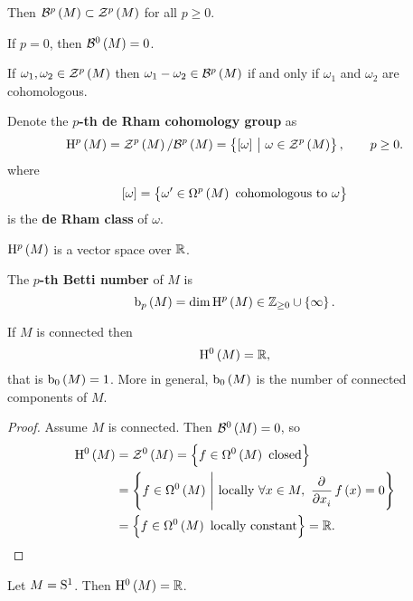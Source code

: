 Then $ \BBB^p\br{M} \subset \ZZZ^p\br{M} $ for all $ p \ge 0 $.

\begin{notation*}
If $ p = 0 $, then $ \BBB^0\br{M} = 0 $.
\end{notation*}

\begin{note*}
If $ \omega_1, \omega_2 \in \ZZZ^p\br{M} $ then $ \omega_1 - \omega_2 \in \BBB^p\br{M} $ if and only if $ \omega_1 $ and $ \omega_2 $ are cohomologous.
\end{note*}

\begin{definition}
Denote the \textbf{$ p $-th de Rham cohomology group} as
$$ \H^p\br{M} = \ZZZ^p\br{M} / \BBB^p\br{M} = \cbr{\sbr{\omega} \st \omega \in \ZZZ^p\br{M}}, \qquad p \ge 0. $$
where
$$ \sbr{\omega} = \cbr{\omega' \in \Omega^p\br{M} \ \text{cohomologous to} \ \omega} $$
is the \textbf{de Rham class} of $ \omega $.
\end{definition}

\begin{remark*}
$ \H^p\br{M} $ is a vector space over $ \RR $.
\end{remark*}

\begin{definition}
The \textbf{$ p $-th Betti number} of $ M $ is
$$ \b_p\br{M} = \dim \H^p\br{M} \in \ZZ_{\ge 0} \cup \cbr{\infty}. $$
\end{definition}

\begin{proposition}
If $ M $ is connected then
$$ \H^0\br{M} = \RR, $$
that is $ \b_0\br{M} = 1 $. More in general, $ \b_0\br{M} $ is the number of connected components of $ M $.
\end{proposition}

\begin{proof}
Assume $ M $ is connected. Then $ \BBB^0\br{M} = 0 $, so
\begin{align*}
\H^0\br{M}
& = \ZZZ^0\br{M}
= \cbr{f \in \Omega^0\br{M} \ \text{closed}} \\
& = \cbr{f \in \Omega^0\br{M} \st \text{locally} \ \forall x \in M, \ \dpd{}{x_i}f\br{x} = 0} \\
& = \cbr{f \in \Omega^0\br{M} \ \text{locally constant}}
= \RR.
\end{align*}
\end{proof}

\begin{example*}
Let $ M = \S^1 $. Then $ \H^0\br{M} = \RR $.
\end{example*}

